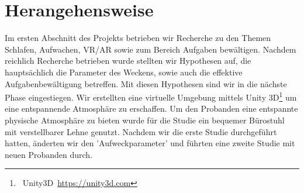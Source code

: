 \section{Herangehensweise}\label{sec:approach}  

Im ersten Abschnitt des Projekts betrieben wir Recherche zu den Themen Schlafen, Aufwachen, VR/AR sowie zum Bereich Aufgaben bewältigen. Nachdem reichlich Recherche betrieben wurde stellten wir Hypothesen auf, die hauptsächlich die Parameter des Weckens, sowie auch die effektive Aufgabenbewältigung betreffen. Mit diesen Hypothesen sind wir in die nächste Phase eingestiegen. 
Wir erstellten eine virtuelle Umgebung mittels Unity 3D\footnote{~Unity3D~\url{https://unity3d.com}} um eine entspannende Atmosphäre zu erschaffen. Um den Probanden eine entspannte physische Atmosphäre zu bieten wurde für die Studie ein bequemer Bürostuhl mit verstellbarer Lehne genutzt. Nachdem wir die erste Studie durchgeführt hatten, änderten wir den 'Aufweckparameter' und führten eine zweite Studie mit neuen Probanden durch. 
